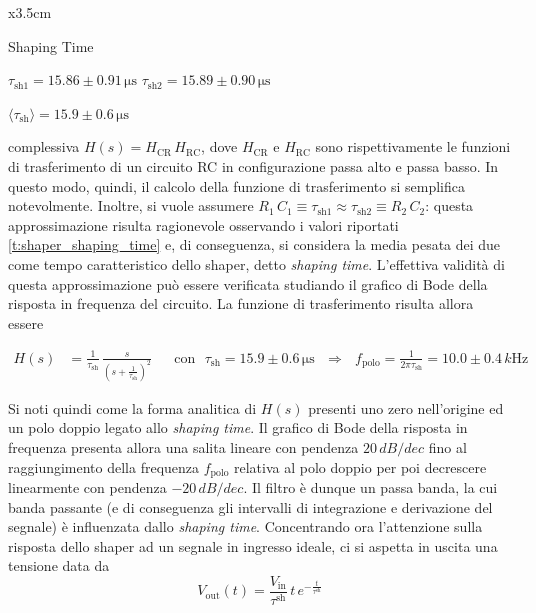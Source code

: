 \documentclass[a4paper,11pt]{article} %
\begin{document}
\begin{table}
	\small
	\centering
	\begin{tabular}{x{3.5cm}} 
		\toprule[0.5px]
		\toprule[0.1px]	
		
		Shaping Time \tn

		\midrule[0.1px]
		
		\addlinespace

		$\tau_{\text{sh}1} = 15.86 \pm 0.91 \,\si{\us}$ \tn
		$\tau_{\text{sh}2} = 15.89 \pm 0.90 \,\si{\us}$ \tn

		\addlinespace

		$\langle\tau_{\text{sh}}\rangle = 15.9 \pm 0.6 \,\si{\us}$ \tn


		\bottomrule[0.5px]		
	\end{tabular}
	\vspace{-5pt}
	\caption{\small Stime di $\tau^{\text{sh}}$.}
	\label{t:shaper_shaping_time}
\end{table}	

 complessiva $H(s) = H_{\text{CR}} \, H_{\text{RC}}$, dove $H_{\text{CR}}$ e
$H_{\text{RC}}$ sono rispettivamente le funzioni di trasferimento di un circuito RC in configurazione passa alto e passa
basso. In questo modo, quindi, il calcolo della funzione di trasferimento si semplifica notevolmente. Inoltre, si vuole
assumere $R_1 \, C_1 \equiv \tau_{\text{sh}1} \approx \tau_{\text{sh2}} \equiv R_2 \, C_2$: questa approssimazione
risulta ragionevole osservando i valori riportati \autoref{t:shaper_shaping_time} e, di conseguenza, si considera la
media pesata dei due come tempo caratteristico dello shaper, detto \textit{shaping time}. L'effettiva validità di questa
approssimazione può essere verificata studiando il grafico di Bode della risposta in frequenza del circuito. La funzione
di trasferimento risulta allora essere

\begin{align}\label{e:shaper_H} 
	H(s) &= \frac{ 1 }{ \tau_{\text{sh} } }  \,  
	\frac{ s }{ \left( s + \frac{ 1 }{ \tau_{\text{sh} } } \right)^2}  
   	& 
   	&\text{con} \,\,\,\, \tau_{\text{sh}}= 15.9 \pm 0.6 \,\si{\us} 
   	\,\,\,\,\Longrightarrow\,\,\,\,
   	f_{\text{polo}}=\frac{1}{2\pi \tau_{\text{sh}}}= 10.0 \pm 0.4 \,\si{k\Hz}
\end{align}

Si noti quindi come la forma analitica di $H(s)$ presenti uno zero nell'origine ed un polo doppio legato allo
\textit{shaping time}. Il grafico di Bode della risposta in frequenza presenta allora una salita lineare con pendenza
$20\,\si{dB/dec}$ fino al raggiungimento della frequenza $f_{\text{polo}}$ relativa al polo doppio per poi decrescere
linearmente con pendenza $-20\,\si{dB/dec}$. Il filtro è dunque un passa banda, la cui banda passante (e di conseguenza
gli intervalli di integrazione e derivazione del segnale) è influenzata dallo \textit{shaping time}. Concentrando ora
l'attenzione sulla risposta dello shaper ad un segnale in ingresso ideale, ci si aspetta in uscita una tensione data da 
\begin{equation} 
	V_{\text{out}}(t)=\frac{V_{\text{in}}}{\tau^{ \text{sh} }} \, t \,
	e^{-\frac{t}{\tau^{ \text{sh} } }} 
\end{equation} 
\end{document}

